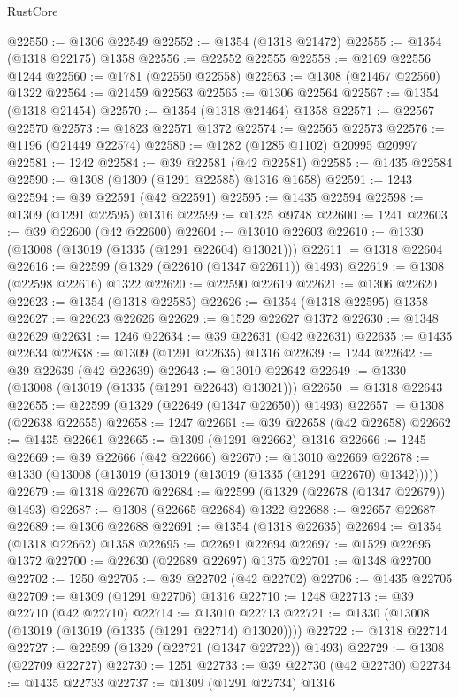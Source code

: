 \begin{lexlean}{RustCore}
\begin{coremodule}
@22550 := @1306 @22549
@22552 := @1354 (@1318 @21472)
@22555 := @1354 (@1318 @22175) @1358
@22556 := @22552 @22555
@22558 := @2169 @22556 @1244
@22560 := @1781 (@22550 @22558)
@22563 := @1308 (@21467 @22560) @1322
@22564 := @21459 @22563
@22565 := @1306 @22564
@22567 := @1354 (@1318 @21454)
@22570 := @1354 (@1318 @21464) @1358
@22571 := @22567 @22570
@22573 := @1823 @22571 @1372
@22574 := @22565 @22573
@22576 := @1196 (@21449 @22574)
@22580 := @1282 (@1285 @1102) @20995 @20997
@22581 := 1242
@22584 := @39 @22581 (@42 @22581)
@22585 := @1435 @22584
@22590 := @1308 (@1309 (@1291 @22585) @1316 @1658)
@22591 := 1243
@22594 := @39 @22591 (@42 @22591)
@22595 := @1435 @22594
@22598 := @1309 (@1291 @22595) @1316
@22599 := @1325 @9748
@22600 := 1241
@22603 := @39 @22600 (@42 @22600)
@22604 := @13010 @22603
@22610 := @1330 (@13008 (@13019 (@1335 (@1291 @22604) @13021)))
@22611 := @1318 @22604
@22616 := @22599 (@1329 (@22610 (@1347 @22611)) @1493)
@22619 := @1308 (@22598 @22616) @1322
@22620 := @22590 @22619
@22621 := @1306 @22620
@22623 := @1354 (@1318 @22585)
@22626 := @1354 (@1318 @22595) @1358
@22627 := @22623 @22626
@22629 := @1529 @22627 @1372
@22630 := @1348 @22629
@22631 := 1246
@22634 := @39 @22631 (@42 @22631)
@22635 := @1435 @22634
@22638 := @1309 (@1291 @22635) @1316
@22639 := 1244
@22642 := @39 @22639 (@42 @22639)
@22643 := @13010 @22642
@22649 := @1330 (@13008 (@13019 (@1335 (@1291 @22643) @13021)))
@22650 := @1318 @22643
@22655 := @22599 (@1329 (@22649 (@1347 @22650)) @1493)
@22657 := @1308 (@22638 @22655)
@22658 := 1247
@22661 := @39 @22658 (@42 @22658)
@22662 := @1435 @22661
@22665 := @1309 (@1291 @22662) @1316
@22666 := 1245
@22669 := @39 @22666 (@42 @22666)
@22670 := @13010 @22669
@22678 := @1330 (@13008 (@13019 (@13019 (@13019 (@1335 (@1291 @22670) @1342)))))
@22679 := @1318 @22670
@22684 := @22599 (@1329 (@22678 (@1347 @22679)) @1493)
@22687 := @1308 (@22665 @22684) @1322
@22688 := @22657 @22687
@22689 := @1306 @22688
@22691 := @1354 (@1318 @22635)
@22694 := @1354 (@1318 @22662) @1358
@22695 := @22691 @22694
@22697 := @1529 @22695 @1372
@22700 := @22630 (@22689 @22697) @1375
@22701 := @1348 @22700
@22702 := 1250
@22705 := @39 @22702 (@42 @22702)
@22706 := @1435 @22705
@22709 := @1309 (@1291 @22706) @1316
@22710 := 1248
@22713 := @39 @22710 (@42 @22710)
@22714 := @13010 @22713
@22721 := @1330 (@13008 (@13019 (@13019 (@1335 (@1291 @22714) @13020))))
@22722 := @1318 @22714
@22727 := @22599 (@1329 (@22721 (@1347 @22722)) @1493)
@22729 := @1308 (@22709 @22727)
@22730 := 1251
@22733 := @39 @22730 (@42 @22730)
@22734 := @1435 @22733
@22737 := @1309 (@1291 @22734) @1316

\end{coremodule}
\end{lexlean}
